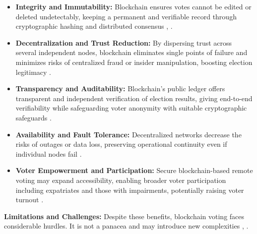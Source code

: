 \documentclass[a4paper,10pt]{report}
\begin{document}
 \begin{itemize} \item \textbf{Integrity and Immutability:}  Blockchain ensures votes cannot be edited or deleted undetectably, keeping a permanent and verifiable record through cryptographic hashing and distributed consensus \cite{mdpi2020}, \cite{pmc2020_access}.

   \item \textbf {Decentralization and Trust Reduction:}  By dispersing trust across several independent nodes, blockchain eliminates single points of failure and minimizes risks of centralized fraud or insider manipulation, boosting election legitimacy \cite{pmc2020_access}.

   \item \textbf {Transparency and Auditability:}  Blockchain’s public ledger offers transparent and independent verification of election results, giving end-to-end verifiability while safeguarding voter anonymity with suitable cryptographic safeguards  \cite{linkedin2021}.

   \item \textbf {Availability and Fault Tolerance:}  Decentralized networks decrease the risks of outages or data loss, preserving operational continuity even if individual nodes fail \cite{pmc2020_access}.

   \item \textbf {Voter Empowerment and Participation:}  Secure blockchain-based remote voting may expand accessibility, enabling broader voter participation including expatriates and those with impairments, potentially raising voter turnout \cite{mdpi2020}.
 \end{itemize}

 \textbf{Limitations and Challenges:}  
 Despite these benefits, blockchain voting faces considerable hurdles.  It is not a panacea and may introduce new complexities  \cite{medium2022}, \cite{grimsbycitizens}.
\end{document}
